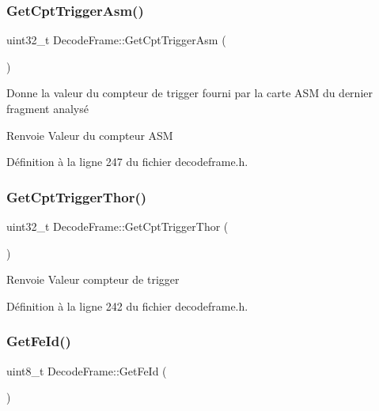 \subsubsection{\texorpdfstring{Get\+Cpt\+Trigger\+Asm()}{GetCptTriggerAsm()}}
{\footnotesize\ttfamily uint32\+\_\+t Decode\+Frame\+::\+Get\+Cpt\+Trigger\+Asm (\begin{DoxyParamCaption}{ }\end{DoxyParamCaption})\hspace{0.3cm}{\ttfamily [inline]}}



Donne la valeur du compteur de trigger fourni par la carte A\+SM du dernier fragment analysé 

\begin{DoxyReturn}{Renvoie}
Valeur du compteur A\+SM 
\end{DoxyReturn}


Définition à la ligne 247 du fichier decodeframe.\+h.

\mbox{\label{class_decode_frame_a582eb89fe03a3076f394776330a6c037}} 
\subsubsection{\texorpdfstring{Get\+Cpt\+Trigger\+Thor()}{GetCptTriggerThor()}}
{\footnotesize\ttfamily uint32\+\_\+t Decode\+Frame\+::\+Get\+Cpt\+Trigger\+Thor (\begin{DoxyParamCaption}{ }\end{DoxyParamCaption})\hspace{0.3cm}{\ttfamily [inline]}}

\begin{DoxyReturn}{Renvoie}
Valeur compteur de trigger 
\end{DoxyReturn}


Définition à la ligne 242 du fichier decodeframe.\+h.

\mbox{\label{class_decode_frame_a27a2218fdc331c7c4afb1b57c103edac}} 
\subsubsection{\texorpdfstring{Get\+Fe\+Id()}{GetFeId()}}
{\footnotesize\ttfamily uint8\+\_\+t Decode\+Frame\+::\+Get\+Fe\+Id (\begin{DoxyParamCaption}{ }\end{DoxyParamCaption})\hspace{0.3cm}{\ttfamily [inline]}}



